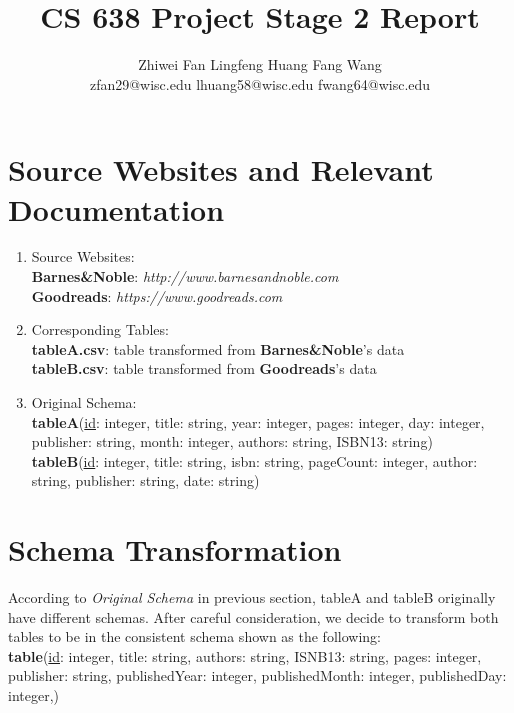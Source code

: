 \documentclass[10pt, oneside]{article}
\title{\textbf{CS 638 Project Stage 2 Report}}
\author{Zhiwei Fan\hspace{7ex}
	   Lingfeng Huang\hspace{7ex}
	   Fang Wang\\
	   zfan29@wisc.edu\hspace{3ex}
	   lhuang58@wisc.edu\hspace{3ex}
	   fwang64@wisc.edu
	   }
\begin{document}
\maketitle 

\section*{Source Websites and Relevant Documentation}
\begin{enumerate}
  	\item Source Websites:\\
		\textbf{Barnes\&Noble}: \textit{http://www.barnesandnoble.com}\\
		\textbf{Goodreads}: \textit{https://www.goodreads.com}
		
	\item Corresponding Tables:\\
		\textbf{tableA.csv}: table transformed from \textbf{Barnes\&Noble}'s data\\
		\textbf{tableB.csv}: table transformed from \textbf{Goodreads}'s data
		
	\item Original Schema:\\
		\textbf{tableA}(\underline{id}: integer, title: string, year: integer, pages: integer, day: integer, publisher: string, month: integer, authors: string, ISBN13: string)\\
		\textbf{tableB}(\underline{id}: integer, title: string, isbn: string, pageCount: integer, author: string, publisher: string, date: string)	
\end{enumerate}

\section*{Schema Transformation}
According to \textit{Original Schema} in previous section, tableA and tableB originally have different schemas. After careful consideration, we decide to transform both tables to 
be in the consistent schema shown as the following: 
\vspace{1ex}
 \\
 \textbf{table}(\underline{id}: integer, title: string, authors: string, ISNB13: string,  pages: integer, publisher: string, publishedYear: integer, publishedMonth: integer, publishedDay: integer,)
 
\end{document}
